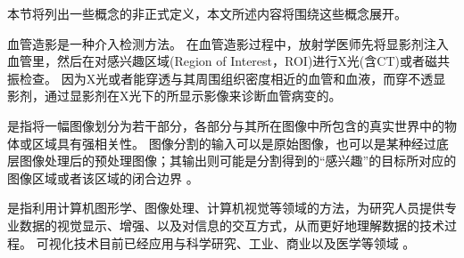 本节将列出一些概念的非正式定义，本文所述内容将围绕这些概念展开。


\begin{definition}[血管造影]
血管造影是一种介入检测方法。
在血管造影过程中，放射学医师先将显影剂注入血管里，然后在对感兴趣区域(Region of Interest，ROI)进行X光(含CT)或者磁共振检查。
因为X光或者能穿透与其周围组织密度相近的血管和血液，而穿不透显影剂，通过显影剂在X光下的所显示影像来诊断血管病变的。
\end{definition}

\begin{definition}[经皮介入血管成形术]
\end{definition}

\begin{definition}[图像分割]
是指将一幅图像划分为若干部分，各部分与其所在图像中所包含的真实世界中的物体或区域具有强相关性。
图像分割的输入可以是原始图像，也可以是某种经过底层图像处理后的预处理图像；其输出则可能是分割得到的“感兴趣”的目标所对应的图像区域或者该区域的闭合边界 \cite{Sonka2008ImageBook,Wang2008ImageBook}。
\end{definition}

\begin{definition}[可视化]
是指利用计算机图形学、图像处理、计算机视觉等领域的方法，为研究人员提供专业数据的视觉显示、增强、以及对信息的交互方式，从而更好地理解数据的技术过程。
可视化技术目前已经应用与科学研究、工业、商业以及医学等领域 \cite{Hearn2004CGBook}。
\end{definition}

